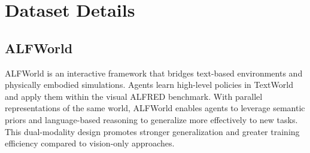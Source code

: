 \documentclass{llmxive}
\providecommand{\arraystretch}{1}
\begin{document}
\appendix
\section{Dataset Details}
\label{appx:a} 

\subsection{ALFWorld}
ALFWorld is an interactive framework that bridges text-based environments and physically embodied simulations. Agents learn high-level policies in TextWorld and apply them within the visual ALFRED benchmark. With parallel representations of the same world, ALFWorld enables agents to leverage semantic priors and language-based reasoning to generalize more effectively to new tasks. This dual-modality design promotes stronger generalization and greater training efficiency compared to vision-only approaches.
 

\begin{table}[t]
\begin{center} 
\renewcommand{\arraystretch}{1}   
\setlength\tabcolsep{16pt} 
\end{center}
\vspace{-0.3cm}
\caption{Hyper-parameters for RL training.}\label{tab:hyp} 
\vspace{-0.3cm}
\end{table}
\end{document}
